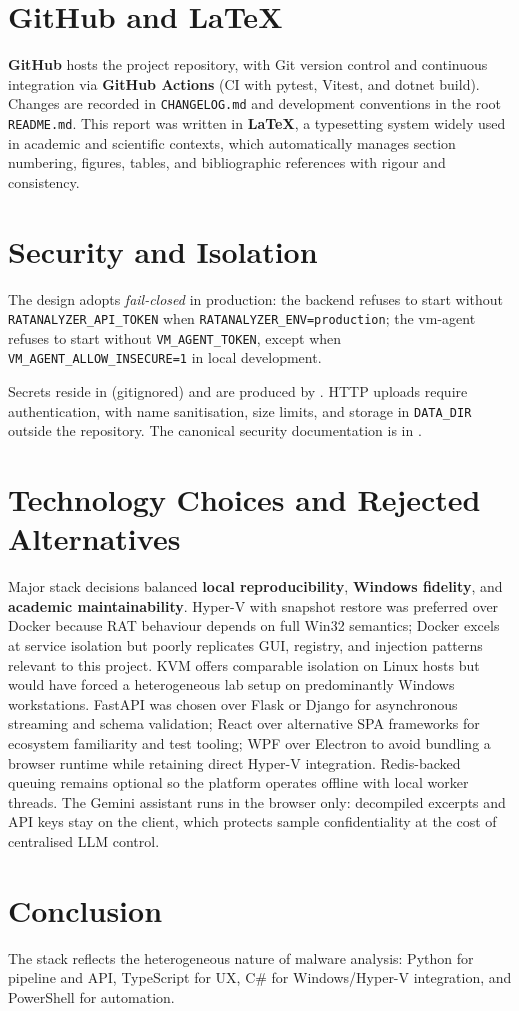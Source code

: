 \section{GitHub and LaTeX}

\textbf{GitHub} hosts the project repository, with Git version control and continuous integration
via \textbf{GitHub Actions} (CI with pytest, Vitest, and dotnet build). Changes are recorded in
\texttt{CHANGELOG.md} and development conventions in the root \texttt{README.md}. This report was
written in \textbf{\LaTeX}, a typesetting system widely used in academic and scientific contexts,
which automatically manages section numbering, figures, tables, and bibliographic references
with rigour and consistency.

\section{Security and Isolation}

The design adopts \emph{fail-closed} in production: the backend refuses to start without
\texttt{RATANALYZER\_API\_TOKEN} when \texttt{RATANALYZER\_ENV=production}; the vm-agent
refuses to start without \texttt{VM\_AGENT\_TOKEN}, except when
\texttt{VM\_AGENT\_ALLOW\_INSECURE=1} in local development.

Secrets reside in  (gitignored) and are produced by
.
HTTP uploads require authentication, with name sanitisation, size limits, and storage in
\texttt{DATA\_DIR} outside the repository. The canonical security documentation is in
.

\section{Technology Choices and Rejected Alternatives}

Major stack decisions balanced \textbf{local reproducibility}, \textbf{Windows fidelity}, and
\textbf{academic maintainability}. Hyper-V with snapshot restore was preferred over Docker because
RAT behaviour depends on full Win32 semantics; Docker excels at service isolation but poorly
replicates GUI, registry, and injection patterns relevant to this project. KVM offers comparable
isolation on Linux hosts but would have forced a heterogeneous lab setup on predominantly Windows
workstations. FastAPI was chosen over Flask or Django for asynchronous streaming and schema
validation; React over alternative SPA frameworks for ecosystem familiarity and test tooling; WPF
over Electron to avoid bundling a browser runtime while retaining direct Hyper-V integration.
Redis-backed queuing remains optional so the platform operates offline with local worker threads.
The Gemini assistant runs in the browser only: decompiled excerpts and API keys stay on the client,
which protects sample confidentiality at the cost of centralised LLM control.

\section{Conclusion}

The stack reflects the heterogeneous nature of malware analysis: Python for pipeline and API,
TypeScript for UX, C\# for Windows/Hyper-V integration, and PowerShell for automation.
